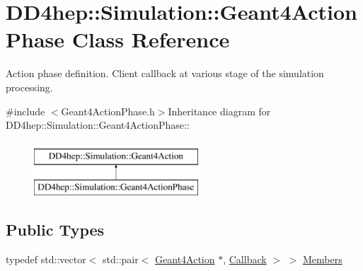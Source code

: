 \hypertarget{class_d_d4hep_1_1_simulation_1_1_geant4_action_phase}{
\section{DD4hep::Simulation::Geant4ActionPhase Class Reference}
\label{class_d_d4hep_1_1_simulation_1_1_geant4_action_phase}
}


Action phase definition. Client callback at various stage of the simulation processing.  


{\ttfamily \#include $<$Geant4ActionPhase.h$>$}Inheritance diagram for DD4hep::Simulation::Geant4ActionPhase::\begin{figure}[H]
\begin{center}
\leavevmode
\includegraphics[height=2cm]{class_d_d4hep_1_1_simulation_1_1_geant4_action_phase}
\end{center}
\end{figure}
\subsection*{Public Types}
\begin{DoxyCompactItemize}
\item 
typedef std::vector$<$ std::pair$<$ \hyperlink{class_d_d4hep_1_1_simulation_1_1_geant4_action}{Geant4Action} $\ast$, \hyperlink{class_d_d4hep_1_1_callback}{Callback} $>$ $>$ \hyperlink{class_d_d4hep_1_1_simulation_1_1_geant4_action_phase_a4df9a501a5c2d810603cd58f5ff5157d}{Members}
\end{DoxyCompactItemize}
